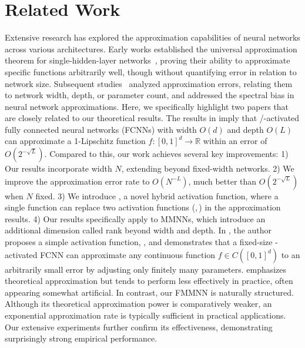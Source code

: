 \section{Related Work}
\label{sec:related:work}


Extensive research has explored the approximation capabilities of neural networks across various architectures. Early works established the universal approximation theorem for single-hidden-layer networks~\cite{Cybenko1989ApproximationBS,HORNIK1991251,HORNIK1989359}, proving their ability to approximate specific functions arbitrarily well, though without quantifying error in relation to network size. Subsequent studies~\cite{yarotsky18a,yarotsky2017,doi:10.1137/18M118709X,ZHOU2019,10.3389/fams.2018.00014,2019arXiv190501208G,2019arXiv190207896G,MO,shijun:NonlineArpprox,shijun:Characterized:by:Numer:Neurons,shijun:smooth:functions,shijun:arbitrary:error:with:fixed:size,shijun:thesis,shijun:intrinsic:parameters,shijun:2023:beyond:ReLU:to:diverse:actfun,yarotsky:2019:06, fang2024addressing,shijun:2023:beyond:ReLU:to:diverse:actfun} analyzed approximation errors, relating them to network width, depth, or parameter count, and addressed the spectral bias in neural network approximations. 
Here, we specifically highlight two papers \cite{shijun:arbitrary:error:with:fixed:size, yarotsky:2019:06} that are closely related to our theoretical results.
 The results in \cite{yarotsky:2019:06} imply that \ReLU/\sine-activated fully connected neural networks (FCNNs) with width $O(d)$ and depth $O(L)$ can approximate a 1-Lipschitz function $f:[0,1]^d\to\mathbb{R}$ within an error of $O(2^{-\sqrt{L}})$. Compared to this, our work achieves several key improvements: 
1) Our results incorporate width $N$, extending beyond fixed-width networks.  
2) We improve the approximation error rate to $O(N^{-L})$, much better than $O(2^{-\sqrt{L}})$ when $N$ fixed.  
3) We introduce \SinTU{}, a novel hybrid activation function, where a single \SinTU{} function can replace two activation functions (\ReLU,\,\sine) in the approximation results.  
4) Our results specifically apply to MMNNs, which introduce an additional dimension called rank beyond width and depth.  
In \cite{shijun:arbitrary:error:with:fixed:size}, the author proposes a simple activation function, \EUAF, and demonstrates that a fixed-size \EUAF-activated FCNN can approximate any continuous function $f\in C([0,1]^d)$ to an arbitrarily small error by adjusting only finitely many parameters. 
\EUAF{} emphasizes theoretical approximation but tends to perform less effectively in practice, often appearing somewhat artificial. 
In contrast, our FMMNN is naturally structured. Although its theoretical approximation power is comparatively weaker, an exponential approximation rate is typically sufficient in practical applications. Our extensive experiments further confirm its effectiveness, demonstrating surprisingly strong empirical performance.




